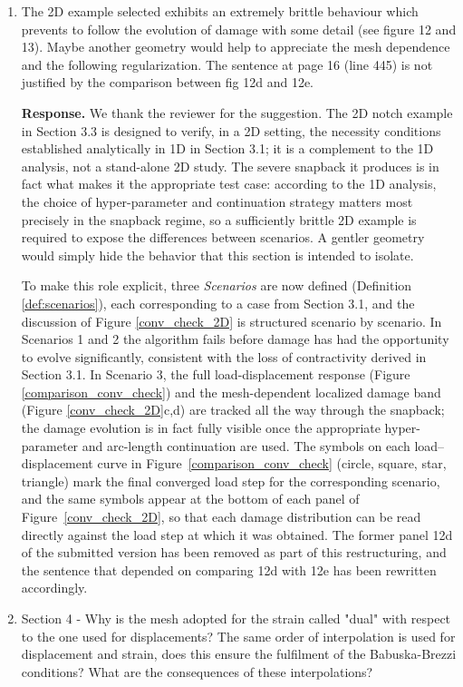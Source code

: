 \documentclass[10pt]{article}
\begin{document}
\begin{enumerate}
\color{black}
\item The 2D example selected exhibits an extremely brittle behaviour which prevents to follow the evolution of damage with some detail (see figure 12 and 13). Maybe another geometry would help to appreciate the mesh dependence and the following regularization. The sentence at page 16 (line 445) is not justified by the comparison between fig 12d and 12e.

\color{blue}
\textbf{Response.} We thank the reviewer for the suggestion. The 2D notch example in Section 3.3 is designed to verify, in a 2D setting, the necessity conditions established analytically in 1D in Section 3.1; it is a complement to the 1D analysis, not a stand-alone 2D study. The severe snapback it produces is in fact what makes it the appropriate test case: according to the 1D analysis, the choice of hyper-parameter and continuation strategy matters most precisely in the snapback regime, so a sufficiently brittle 2D example is required to expose the differences between scenarios. A gentler geometry would simply hide the behavior that this section is intended to isolate.

To make this role explicit, three \emph{Scenarios} are now defined (Definition \ref{def:scenarios}), each corresponding to a case from Section 3.1, and the discussion of Figure \ref{conv_check_2D} is structured scenario by scenario. In Scenarios 1 and 2 the algorithm fails before damage has had the opportunity to evolve significantly, consistent with the loss of contractivity derived in Section 3.1. In Scenario 3, the full load-displacement response (Figure \ref{comparison_conv_check}) and the mesh-dependent localized damage band (Figure \ref{conv_check_2D}c,d) are tracked all the way through the snapback; the damage evolution is in fact fully visible once the appropriate hyper-parameter and arc-length continuation are used. The symbols on each load--displacement curve in Figure~\ref{comparison_conv_check} (circle, square, star, triangle) mark the final converged load step for the corresponding scenario, and the same symbols appear at the bottom of each panel of Figure~\ref{conv_check_2D}, so that each damage distribution can be read directly against the load step at which it was obtained. The former panel 12d of the submitted version has been removed as part of this restructuring, and the sentence that depended on comparing 12d with 12e has been rewritten accordingly.

\color{black}
\item Section 4 - Why is the mesh adopted for the strain called "dual" with respect to the one used for displacements? The same order of interpolation is used for displacement and strain, does this ensure the fulfilment of the Babuska-Brezzi conditions? What are the consequences of these interpolations?


\end{enumerate}
\end{document}
